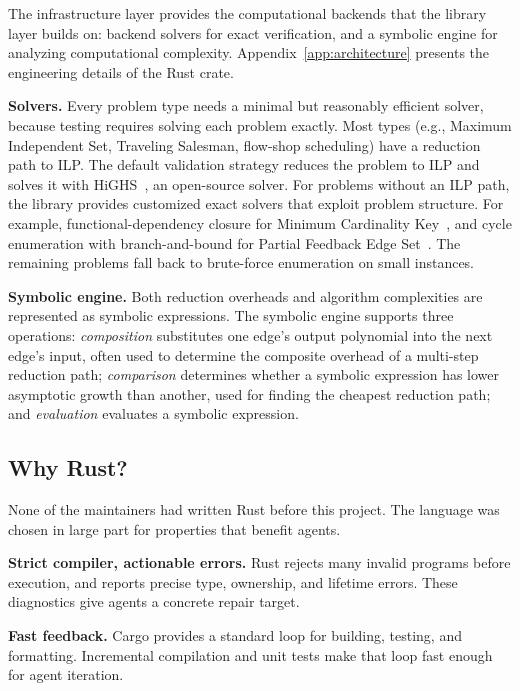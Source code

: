 \documentclass{article}
\begin{document}
The infrastructure layer provides the computational backends that the library layer builds on: backend solvers for exact verification, and a symbolic engine for analyzing computational complexity. Appendix~\ref{app:architecture} presents the engineering details of the Rust crate.

\textbf{Solvers.}
Every problem type needs a minimal but reasonably efficient solver, because testing requires solving each problem exactly.
Most types (e.g., Maximum Independent Set, Traveling Salesman, flow-shop scheduling) have a reduction path to ILP.
The default validation strategy reduces the problem to ILP and solves it with HiGHS~\cite{Huangfu2018HiGHS}, an open-source solver.
For problems without an ILP path, the library provides customized exact solvers that exploit problem structure. For example, functional-dependency closure for Minimum Cardinality Key~\cite{Lucchesi1978CandidateKeys}, and cycle enumeration with branch-and-bound for Partial Feedback Edge Set~\cite{Baharev2021FeedbackArcSet}.
The remaining problems fall back to brute-force enumeration on small instances.

\textbf{Symbolic engine.}
Both reduction overheads and algorithm complexities are represented as symbolic expressions.
The symbolic engine supports three operations: \emph{composition} substitutes one edge's output polynomial into the next edge's input, often used to determine the composite overhead of a multi-step reduction path; \emph{comparison} determines whether a symbolic expression has lower asymptotic growth than another, used for finding the cheapest reduction path; and \emph{evaluation} evaluates a symbolic expression.

\subsection{Why Rust?}\label{sec:why-rust}

None of the maintainers had written Rust before this project.
The language was chosen in large part for properties that benefit agents.

\textbf{Strict compiler, actionable errors.}
Rust rejects many invalid programs before execution, and reports precise type, ownership, and lifetime errors.
These diagnostics give agents a concrete repair target.

\textbf{Fast feedback.}
Cargo provides a standard loop for building, testing, and formatting.
Incremental compilation and unit tests make that loop fast enough for agent iteration.
\end{document}
